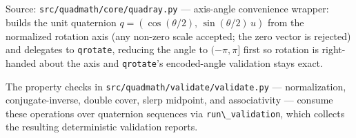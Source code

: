 \documentclass[
  10pt,
]{article}
\newcommand{\passthrough}[1]{#1}
\begin{document}
Source: \passthrough{\lstinline!src/quadmath/core/quadray.py!} ---
axis-angle convenience wrapper: builds the unit quaternion
\(q = (\cos(\theta/2),\, \sin(\theta/2)\,\hat{u})\) from the normalized
rotation axis (any non-zero scale accepted; the zero vector is rejected)
and delegates to \passthrough{\lstinline!qrotate!}, reducing the angle
to \((-\pi, \pi]\) first so rotation is right-handed about the axis and
\passthrough{\lstinline!qrotate!}'s encoded-angle validation stays
exact.

The property checks in
\passthrough{\lstinline!src/quadmath/validate/validate.py!} ---
normalization, conjugate-inverse, double cover, slerp midpoint, and
associativity --- consume these operations over quaternion sequences via
\passthrough{\lstinline!run\_validation!}, which collects the resulting
deterministic validation reports.
\end{document}
